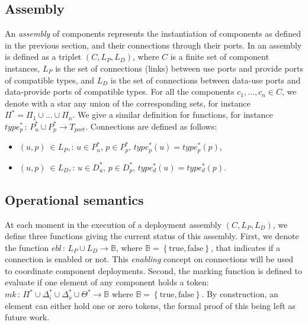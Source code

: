 \subsection{Assembly}

An \emph{assembly} of components represents the instantiation of
components as defined in the previous section, and their connections
through their ports. In \mad an assembly is defined as a triplet
$(C, L_{P}, L_{D})$, where $C$ is a finite set of component instances,
$L_{P}$ is the set of connections (links) between use ports and
provide ports of compatible types, and $L_{D}$ is the set of
connections between data-use ports and data-provide ports of
compatible types. For all the components $c_1,\dots,c_n \in C$, we
denote with a star any union of the corresponding sets, for instance
$\Pi^* = \Pi_1 \cup \dots \cup \Pi_n$. We give a similar definition
for functions, for instance
$type_{p}^*\,:\,P_{u}^*\cup P_{p}^*\rightarrow T_{port}$. Connections
are defined as follows:

\begin{itemize}
\item $\left(u,p\right)\ \in L_{P},:\,u\in P_{u}^{*},\,p\in P_{p}^{*},\,type_{p}^{*}\left(u\right)=type_{p}^{*}\left(p\right)$,
\item $\left(u,p\right)\ \in L_{D},:\,u\in D_{u}^{*},\,p\in D_{p}^{*},\,type_{d}^{*}\left(u\right)=type_{d}^{*}\left(p\right)$.
\end{itemize}

\subsection{Operational semantics}

At each moment in the execution of a \mad deployment assembly
$(C, L_{P}, L_{D})$, we define three functions giving the current
status of this assembly. First, we denote the function
$ebl\,:\,L_{P}\cup L_{D}\rightarrow\mathbb{B}$, where
$\mathbb{B}=\left\{ \text{true},\text{false}\right\}$, that indicates
if a connection is enabled or not. This \emph{enabling} concept on
connections will be used to coordinate component deployments. Second,
the marking function is defined to evaluate if one element of any
component holds a token:
$mk\,:\,\Pi^{*}\cup\Delta_{i}^{*}\cup\Delta_{o}^{*}\cup\Theta^{*}\rightarrow\mathbb{B}$
where $\mathbb{B}=\left\{ \text{true},\text{false}\right\}$. By
construction, an element can either hold one or zero tokens, the
formal proof of this being left as future work.

